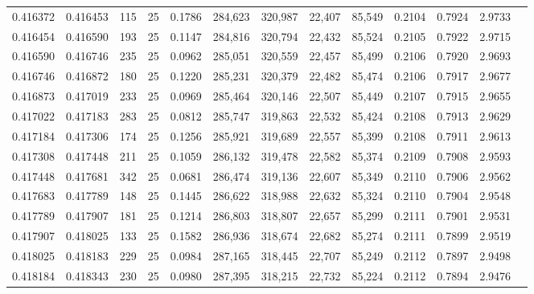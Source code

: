 \begin{tabular}{rrrrrrrrrrrrr}
0.416372 & 0.416453 &   115 &  25 &                                     0.1786 & 284,623 & 320,987 &  22,407 &  85,549 & 0.2104 & 0.7924 & 2.9733 \\
0.416454 & 0.416590 &   193 &  25 &                                     0.1147 & 284,816 & 320,794 &  22,432 &  85,524 & 0.2105 & 0.7922 & 2.9715 \\
0.416590 & 0.416746 &   235 &  25 &                                     0.0962 & 285,051 & 320,559 &  22,457 &  85,499 & 0.2106 & 0.7920 & 2.9693 \\
0.416746 & 0.416872 &   180 &  25 &                                     0.1220 & 285,231 & 320,379 &  22,482 &  85,474 & 0.2106 & 0.7917 & 2.9677 \\
0.416873 & 0.417019 &   233 &  25 &                                     0.0969 & 285,464 & 320,146 &  22,507 &  85,449 & 0.2107 & 0.7915 & 2.9655 \\
0.417022 & 0.417183 &   283 &  25 &                                     0.0812 & 285,747 & 319,863 &  22,532 &  85,424 & 0.2108 & 0.7913 & 2.9629 \\
0.417184 & 0.417306 &   174 &  25 &                                     0.1256 & 285,921 & 319,689 &  22,557 &  85,399 & 0.2108 & 0.7911 & 2.9613 \\
0.417308 & 0.417448 &   211 &  25 &                                     0.1059 & 286,132 & 319,478 &  22,582 &  85,374 & 0.2109 & 0.7908 & 2.9593 \\
0.417448 & 0.417681 &   342 &  25 &                                     0.0681 & 286,474 & 319,136 &  22,607 &  85,349 & 0.2110 & 0.7906 & 2.9562 \\
0.417683 & 0.417789 &   148 &  25 &                                     0.1445 & 286,622 & 318,988 &  22,632 &  85,324 & 0.2110 & 0.7904 & 2.9548 \\
0.417789 & 0.417907 &   181 &  25 &                                     0.1214 & 286,803 & 318,807 &  22,657 &  85,299 & 0.2111 & 0.7901 & 2.9531 \\
0.417907 & 0.418025 &   133 &  25 &                                     0.1582 & 286,936 & 318,674 &  22,682 &  85,274 & 0.2111 & 0.7899 & 2.9519 \\
0.418025 & 0.418183 &   229 &  25 &                                     0.0984 & 287,165 & 318,445 &  22,707 &  85,249 & 0.2112 & 0.7897 & 2.9498 \\
0.418184 & 0.418343 &   230 &  25 &                                     0.0980 & 287,395 & 318,215 &  22,732 &  85,224 & 0.2112 & 0.7894 & 2.9476 \\

\end{tabular}
